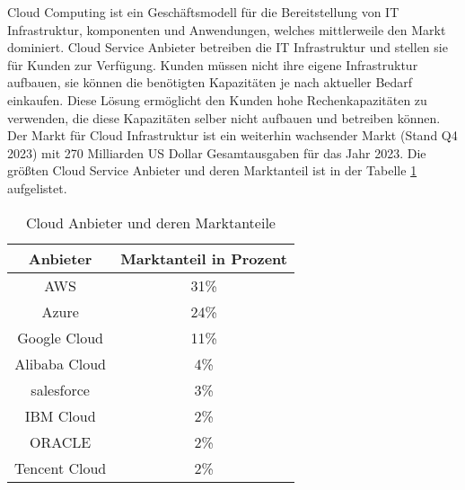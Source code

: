 Cloud Computing ist ein Geschäftsmodell für die Bereitstellung von IT Infrastruktur, komponenten und Anwendungen, welches mittlerweile den Markt dominiert. \cite{Benlian2018} Cloud Service Anbieter betreiben die IT Infrastruktur und stellen sie für Kunden zur Verfügung. Kunden müssen nicht ihre eigene Infrastruktur aufbauen, sie können die benötigten Kapazitäten je nach aktueller Bedarf einkaufen. Diese Lösung ermöglicht den Kunden hohe Rechenkapazitäten zu verwenden, die diese Kapazitäten selber nicht aufbauen und betreiben können.\cite{Arasaratnam2011} Der Markt für Cloud Infrastruktur ist ein weiterhin wachsender Markt (Stand Q4 2023) mit 270 Milliarden US Dollar Gesamtausgaben für das Jahr 2023. Die größten Cloud Service Anbieter und deren Marktanteil ist in der Tabelle \ref{cloud_marktanteile} aufgelistet.

\begin{table}
    \begin{center}
    \caption{Cloud Anbieter und deren Marktanteile}
    \label{cloud_marktanteile}
    \begin{tabular}{|c | c|} 
     \hline
     Anbieter & Marktanteil in Prozent \\
     \hline\hline
     AWS & 31\%\\ 
     \hline
     Azure & 24\% \\
     \hline
     Google Cloud & 11\% \\
     \hline
     Alibaba Cloud & 4\% \\
     \hline
     salesforce & 3\% \\
     \hline
     IBM Cloud & 2\% \\ 
     \hline
     ORACLE & 2\% \\ 
     \hline
     Tencent Cloud & 2\% \\ 
     \hline
    \end{tabular}
\end{center}
\end{table}

